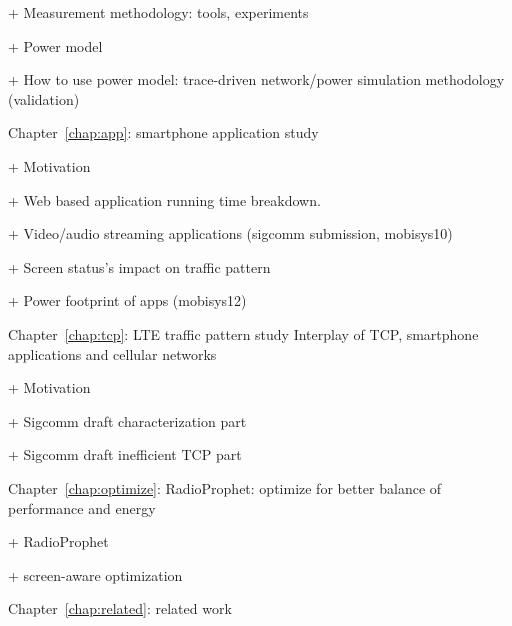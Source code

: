	+ Measurement methodology: tools, experiments

	+ Power model

	+ How to use power model: trace-driven network/power simulation methodology (validation)
	
Chapter~\ref{chap:app}: smartphone application study

	+ Motivation

	+ Web based application running time breakdown.

	+ Video/audio streaming applications (sigcomm submission, mobisys10)

	+ Screen status's impact on traffic pattern

	+ Power footprint of apps (mobisys12)
	
Chapter~\ref{chap:tcp}: LTE traffic pattern study Interplay of TCP, smartphone applications and cellular networks

	+ Motivation

	+ Sigcomm draft characterization part

	+ Sigcomm draft inefficient TCP part
		
Chapter~\ref{chap:optimize}: RadioProphet: optimize for better balance of performance and energy

	+ RadioProphet

	+ screen-aware optimization
	
Chapter~\ref{chap:related}: related work
